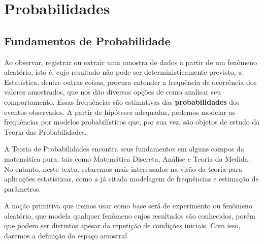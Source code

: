 \section{Probabilidades}

\subsection{Fundamentos de Probabilidade}
Ao observar, registrar ou extrair uma amostra de dados a partir de um fenômeno aleatório,
isto é, cujo resultado não pode ser deterministicamente previsto, a Estatística, dentre
outras coisas, procura entender a frequência de ocorrência dos valores amostrados,
que nos dão diversas opções de como analisar seu comportamento. Essas frequências são
estimativas das \textbf{probabilidades} dos eventos observados. A partir de hipóteses
adequadas, podemos modelar as frequências por modelos probabilísticos que, por sua vez,
são objetos de estudo da Teoria das Probabilidades.

A Teoria de Probabilidades encontra seus fundamentos em alguns campos da matemática pura,
tais como Matemática Discreta, Análise e Teoria da Medida. No entanto, neste texto,
estaremos mais interessados na visão da teoria para aplicações estatísticas, como a já
citada modelagem de frequências e estimação de parâmetros.

A noção primitiva que iremos usar como base será de experimento ou fenômeno aleatório,
que modela qualquer fenômeno cujos resultados são conhecidos, porém que podem ser
distintos apesar da repetição de condições iniciais. Com isso, daremos a definição do
espaço amostral


